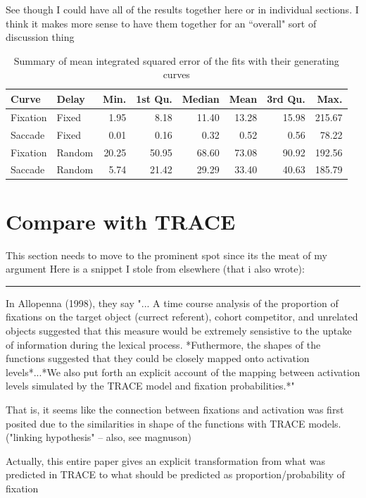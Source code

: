 \documentclass{article}
\begin{document}
See though I could have all of the results together here or in individual sections. I think it makes more sense to have them together for an ``overall" sort of discussion thing

\begin{table}[ht]
\centering
\begin{tabular}{llrrrrrr}
  \hline
Curve & Delay & Min. & 1st Qu. & Median & Mean & 3rd Qu. & Max. \\ 
  \hline
Fixation & Fixed & 1.95 & 8.18 & 11.40 & 13.28 & 15.98 & 215.67 \\ 
  Saccade & Fixed & 0.01 & 0.16 & 0.32 & 0.52 & 0.56 & 78.22 \\ 
  Fixation & Random & 20.25 & 50.95 & 68.60 & 73.08 & 90.92 & 192.56 \\ 
  Saccade & Random & 5.74 & 21.42 & 29.29 & 33.40 & 40.63 & 185.79 \\ 
   \hline
\end{tabular}
\caption{Summary of mean integrated squared error of the fits with their generating curves}
\label{tab:mise_fixed_delay}
\end{table}


\section{Compare with TRACE}

This section needs to move to the prominent spot since its the meat of my argument 
Here is a snippet I stole from elsewhere (that i also wrote):

\noindent\rule{2cm}{0.4pt}

In Allopenna (1998), they say "... A time course analysis of the proportion of fixations on the target object (currect referent), cohort competitor, and unrelated objects suggested that this measure would be extremely sensistive to the uptake of information during the lexical process. *Futhermore, the shapes of the functions suggested that they could be closely mapped onto activation levels*...*We also put forth an explicit account of the mapping between activation levels simulated by the TRACE model and fixation probabilities.*"

That is, it seems like the connection between fixations and activation was first posited due to the similarities in shape of the functions with TRACE models. ("linking hypothesis" -- also, see magnuson)

Actually, this entire paper gives an explicit transformation from what was predicted in TRACE to what should be predicted as proportion/probability of fixation
\end{document}
